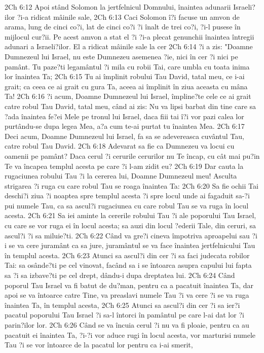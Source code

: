 2Ch 6:12  Apoi stând Solomon la jertfelnicul Domnului, înaintea adunarii Israeli?ilor ?i-a ridicat mâinile sale,
2Ch 6:13  Caci Solomon î?i facuse un amvon de arama, lung de cinci co?i, lat de cinci co?i ?i înalt de trei co?i, ?i-l pusese în mijlocul cur?ii. Pe acest amvon a stat el ?i ?i-a plecat genunchii înaintea întregii adunari a Israeli?ilor. El a ridicat mâinile sale la cer
2Ch 6:14  ?i a zis: "Doamne Dumnezeul lui Israel, nu este Dumnezeu asemenea ?ie, nici în cer ?i nici pe pamânt. Tu paze?ti legamântul ?i mila cu robii Tai, care umbla cu toata inima lor înaintea Ta;
2Ch 6:15  Tu ai împlinit robului Tau David, tatal meu, ce i-ai grait; ca ceea ce ai grait cu gura Ta, aceea ai împlinit în ziua aceasta cu mâna Ta!
2Ch 6:16  ?i acum, Doamne Dumnezeul lui Israel, împline?te cele ce ai grait catre robul Tau David, tatal meu, când ai zis: Nu va lipsi barbat din tine care sa ?ada înaintea fe?ei Mele pe tronul lui Israel, daca fiii tai î?i vor pazi calea lor purtându-se dupa legea Mea, a?a cum te-ai purtat tu înaintea Mea.
2Ch 6:17  Deci acum, Doamne Dumnezeul lui Israel, fa sa se adevereasca cuvântul Tau, catre robul Tau David.
2Ch 6:18  Adevarat sa fie ca Dumnezeu va locui cu oamenii pe pamânt? Daca cerul ?i cerurile cerurilor nu Te încap, cu cât mai pu?in Te va încapea templul acesta pe care ?i l-am zidit eu?
2Ch 6:19  Dar cauta la rugaciunea robului Tau ?i la cererea lui, Doamne Dumnezeul meu! Asculta strigarea ?i ruga cu care robul Tau se roaga înaintea Ta:
2Ch 6:20  Sa fie ochii Tai deschi?i ziua ?i noaptea spre templul acesta ?i spre locul unde ai fagaduit sa-?i pui numele Tau, ca sa ascul?i rugaciunea cu care robul Tau se va ruga în locul acesta.
2Ch 6:21  Sa iei aminte la cererile robului Tau ?i ale poporului Tau Israel, cu care se vor ruga ei în locul acesta; sa auzi din locul ?ederii Tale, din ceruri, sa ascul?i ?i sa miluie?ti.
2Ch 6:22  Când va gre?i cineva împotriva aproapelui sau ?i i se va cere juramânt ca sa jure, juramântul se va face înaintea jertfelnicului Tau în templul acesta.
2Ch 6:23  Atunci sa ascul?i din cer ?i sa faci judecata robilor Tai: sa osânde?ti pe cel vinovat, facând sa i se întoarca asupra capului lui fapta sa ?i sa izbave?ti pe cel drept, dându-i dupa dreptatea lui.
2Ch 6:24  Când poporul Tau Israel va fi batut de du?man, pentru ca a pacatuit înaintea Ta, dar apoi se va întoarce catre Tine, va preaslavi numele Tau ?i va cere ?i se va ruga înaintea Ta, în templul acesta,
2Ch 6:25  Atunci sa ascul?i din cer ?i sa ier?i pacatul poporului Tau Israel ?i sa-l întorci în pamântul pe care l-ai dat lor ?i parin?ilor lor.
2Ch 6:26  Când se va încuia cerul ?i nu va fi ploaie, pentru ca au pacatuit ei înaintea Ta, ?i-?i vor aduce rugi în locul acesta, vor marturisi numele Tau ?i se vor întoarce de la pacatul lor pentru ca i-ai smerit,
